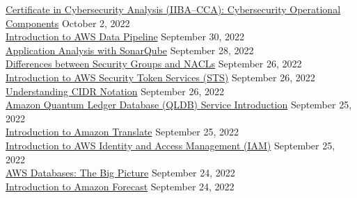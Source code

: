 \documentclass[10pt]{res} %
\begin{document}
\begin{resume}
\href{https://bjdelacruz.dev/files/certificates/pluralsight/8_Certificate_in_Cybersecurity_Analysis_IIBA_CCA_Cybersecurity_Operational_Components.pdf}{\color{blue}Certificate in Cybersecurity Analysis (IIBA\textsuperscript{\textregistered}--CCA): Cybersecurity Operational Components} \hfill October 2, 2022 \\
\href{https://bjdelacruz.dev/files/certificates/pluralsight/Introduction_to_AWS_Data_Pipeline.pdf}{\color{blue}Introduction to AWS Data Pipeline} \hfill September 30, 2022 \\
\href{https://bjdelacruz.dev/files/certificates/pluralsight/22_Application_Analysis_with_SonarQube.pdf}{\color{blue}Application Analysis with SonarQube} \hfill September 28, 2022 \\
\href{https://bjdelacruz.dev/files/certificates/pluralsight/Differences_between_Security_Groups_and_NACLs.pdf}{\color{blue}Differences between Security Groups and NACLs} \hfill September 26, 2022 \\
\href{https://bjdelacruz.dev/files/certificates/pluralsight/Introduction_to_AWS_Security_Token_Services_STS.pdf}{\color{blue}Introduction to AWS Security Token Services (STS)} \hfill September 26, 2022 \\
\href{https://bjdelacruz.dev/files/certificates/pluralsight/Understanding_CIDR_Notation.pdf}{\color{blue}Understanding CIDR Notation} \hfill September 26, 2022 \\
\href{https://bjdelacruz.dev/files/certificates/pluralsight/Amazon_Quantum_Ledger_Database_QLDB_Service_Introduction.pdf}{\color{blue}Amazon Quantum Ledger Database (QLDB) Service Introduction} \hfill September 25, 2022 \\
\href{https://bjdelacruz.dev/files/certificates/pluralsight/Introduction_to_Amazon_Translate.pdf}{\color{blue}Introduction to Amazon Translate} \hfill September 25, 2022 \\
\href{https://bjdelacruz.dev/files/certificates/pluralsight/Introduction_to_AWS_Identity_and_Access_Management_IAM.pdf}{\color{blue}Introduction to AWS Identity and Access Management (IAM)} \hfill September 25, 2022 \\
\href{https://bjdelacruz.dev/files/certificates/pluralsight/AWS_Databases_The_Big_Picture.pdf}{\color{blue}AWS Databases: The Big Picture} \hfill September 24, 2022 \\
\href{https://bjdelacruz.dev/files/certificates/pluralsight/Introduction_to_Amazon_Forecast.pdf}{\color{blue}Introduction to Amazon Forecast} \hfill September 24, 2022 \\

\end{resume}
\end{document}
